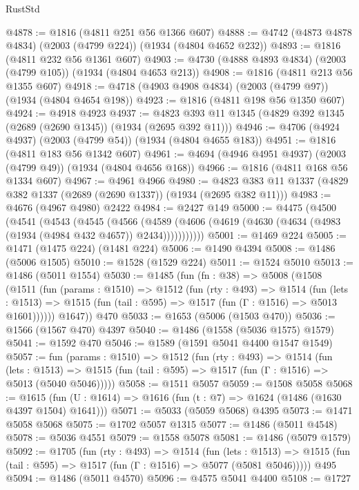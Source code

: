\begin{lexlean}{RustStd}
\begin{coremodule}
@4878 := @1816 (@4811 @251 @56 @1366 @607)
@4888 := @4742 (@4873 @4878 @4834) (@2003 (@4799 @224)) (@1934 (@4804 @4652 @232))
@4893 := @1816 (@4811 @232 @56 @1361 @607)
@4903 := @4730 (@4888 @4893 @4834) (@2003 (@4799 @105)) (@1934 (@4804 @4653 @213))
@4908 := @1816 (@4811 @213 @56 @1355 @607)
@4918 := @4718 (@4903 @4908 @4834) (@2003 (@4799 @97)) (@1934 (@4804 @4654 @198))
@4923 := @1816 (@4811 @198 @56 @1350 @607)
@4924 := @4918 @4923
@4937 := @4823 @393 @11 @1345 (@4829 @392 @1345 (@2689 (@2690 @1345)) (@1934 (@2695 @392 @11)))
@4946 := @4706 (@4924 @4937) (@2003 (@4799 @54)) (@1934 (@4804 @4655 @183))
@4951 := @1816 (@4811 @183 @56 @1342 @607)
@4961 := @4694 (@4946 @4951 @4937) (@2003 (@4799 @49)) (@1934 (@4804 @4656 @168))
@4966 := @1816 (@4811 @168 @56 @1334 @607)
@4967 := @4961 @4966
@4980 := @4823 @383 @11 @1337 (@4829 @382 @1337 (@2689 (@2690 @1337)) (@1934 (@2695 @382 @11)))
@4983 := @4676 (@4967 @4980) @2422
@4984 := @2427 @149
@5000 := @4475
    (@4500
      (@4541
        (@4543
          (@4545
            (@4566
              (@4589 (@4606 (@4619 (@4630 (@4634 (@4983 (@1934 (@4984 @432 @4657)) @2434)))))))))))
@5001 := @1469 @224
@5005 := @1471 (@1475 @224) (@1481 @224)
@5006 := @1490 @4394
@5008 := @1486 (@5006 @1505)
@5010 := @1528 (@1529 @224)
@5011 := @1524 @5010
@5013 := @1486 (@5011 @1554)
@5030 := @1485
    (fun (fn : @38) =>
    @5008
      (@1508
        (@1511
          (fun (params : @1510) =>
          @1512
            (fun (rty : @493) =>
            @1514
              (fun (lets : @1513) =>
              @1515 (fun (tail : @595) => @1517 (fun (Γ : @1516) => @5013 @1601))))))
        @1647))
    @470
@5033 := @1653 (@5006 (@1503 @470))
@5036 := @1566 (@1567 @470) @4397
@5040 := @1486 (@1558 (@5036 @1575) @1579)
@5041 := @1592 @470
@5046 := @1589 (@1591 @5041 @4400 @1547 @1549)
@5057 := fun (params : @1510) =>
  @1512
    (fun (rty : @493) =>
    @1514
      (fun (lets : @1513) =>
      @1515 (fun (tail : @595) => @1517 (fun (Γ : @1516) => @5013 (@5040 @5046)))))
@5058 := @1511 @5057
@5059 := @1508 @5058
@5068 := @1615 (fun (U : @1614) => @1616 (fun (t : @7) => @1624 (@1486 (@1630 @4397 @1504) @1641)))
@5071 := @5033 (@5059 @5068) @4395
@5073 := @1471 @5058 @5068
@5075 := @1702 @5057 @1315
@5077 := @1486 (@5011 @4548)
@5078 := @5036 @4551
@5079 := @1558 @5078
@5081 := @1486 (@5079 @1579)
@5092 := @1705
    (fun (rty : @493) =>
    @1514
      (fun (lets : @1513) =>
      @1515 (fun (tail : @595) => @1517 (fun (Γ : @1516) => @5077 (@5081 @5046)))))
    @495
@5094 := @1486 (@5011 @4570)
@5096 := @4575 @5041 @4400
@5108 := @1727

\end{coremodule}
\end{lexlean}
